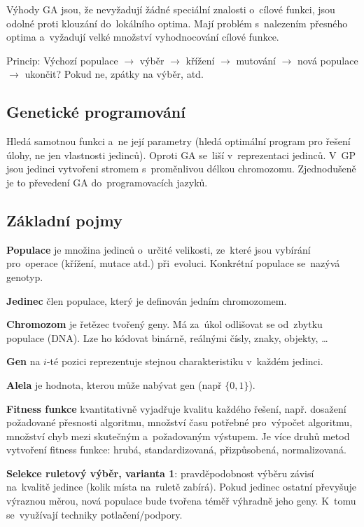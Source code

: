 Výhody GA jsou, že nevyžadují žádné speciální znalosti o~cílové funkci, jsou odolné proti klouzání do~lokálního optima. Mají problém s~nalezením přesného optima a~vyžadují velké množství vyhodnocování cílové funkce.

Princip: Výchozí populace \(\rightarrow\) výběr \(\rightarrow\) křížení \(\rightarrow\) mutování \(\rightarrow\) nová populace \(\rightarrow\) ukončit? Pokud ne, zpátky na výběr, atd.

\subsection{Genetické programování}

Hledá samotnou funkci a~ne její parametry (hledá optimální program pro řešení úlohy, ne jen vlastnosti jedinců). Oproti GA se~liší v~reprezentaci jedinců. V~GP jsou jedinci vytvořeni stromem s~proměnlivou délkou chromozomu. Zjednodušeně je to převedení GA do~programovacích jazyků.

\subsection{Základní pojmy}

\textbf{Populace} je množina jedinců o~určité velikosti, ze~které jsou vybírání pro~operace (křížení, mutace atd.) při~evoluci. Konkrétní populace se~nazývá genotyp.

\textbf{Jedinec} člen populace, který je definován jedním chromozomem.

\textbf{Chromozom} je řetězec tvořený geny. Má za~úkol odlišovat se od~zbytku populace (DNA). Lze ho kódovat binárně, reálnými čísly, znaky, objekty, \dots

\textbf{Gen} na \( i \)-té pozici reprezentuje stejnou charakteristiku v~každém jedinci.

\textbf{Alela} je hodnota, kterou může nabývat gen (např \( \{0, 1\} \)).

\textbf{Fitness funkce} kvantitativně vyjadřuje kvalitu každého řešení, např. dosažení požadované přesnosti algoritmu, množství času potřebné pro~výpočet algoritmu, množství chyb mezi skutečným a~požadovaným výstupem. Je více druhů metod vytvoření fitness funkce: hrubá, standardizovaná, přizpůsobená, normalizovaná.

\textbf{Selekce ruletový výběr, varianta 1}: pravděpodobnost výběru závisí na~kvalitě jedince (kolik místa na~ruletě zabírá). Pokud jedinec ostatní převyšuje výraznou měrou, nová populace bude tvořena téměř výhradně jeho geny. K~tomu se~využívají techniky potlačení/podpory.

